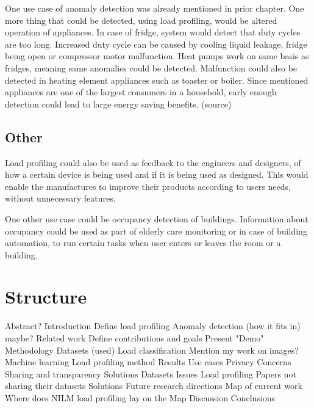 \documentclass[
11pt, %
english, %
singlespacing, %
headsepline, %
]{MastersDoctoralThesis} %
\begin{document}
One use case of anomaly detection was already mentioned in prior chapter.
One more thing that could be detected, using load profiling, would be altered operation of appliances.
In case of fridge, system would detect that duty cycles are too long.
Increased duty cycle can be caused by cooling liquid leakage, fridge being open or compressor motor malfunction.
Heat pumps work on same basis as fridges, meaning same anomalies could be detected. 
Malfunction could also be detected in heating element appliances such as toaster or boiler. 
Since mentioned appliances are one of the largest consumers in a household, early enough detection could lead to large energy saving benefits. (source)

\subsection{Other}

Load profiling could also be used as feedback to the engineers and designers,
of how a certain device is being used and if it is being used as designed. 
This would enable the manufactures to improve their products according to 
users needs, without unnecessary features.

One other use case could be occupancy detection of buildings. Information about 
occupancy could be used as part of elderly care monitoring or in case of building
automation, to run certain tasks when user enters or leaves the room or a building.

\section{Structure}

\begin{outline}
\1 Abstract?
\1 Introduction
\1 Define load profiling
\1 Anomaly detection (how it fits in) maybe?
\1 Related work
\1 Define contributions and goals
\1 Present "Demo"
\1 Methodology
\2 Datasets (used)
\2 Load classification
\3 Mention my work on images?
\3 Machine learning
\2 Load profiling method
\1 Results
\1 Use cases
\1 Privacy
\1 Concerns
\1 Sharing and transparency
\1 Solutions
\1 Datasets
\2 Issues 
\2 Load profiling
\2 Papers not sharing their datasets
\2 Solutions
\1 Future research directions
\2 Map of current work
\2 Where does NILM load profiling lay on the Map
\1 Discussion
\1 Conclusions

\end{outline}


\end{document}
